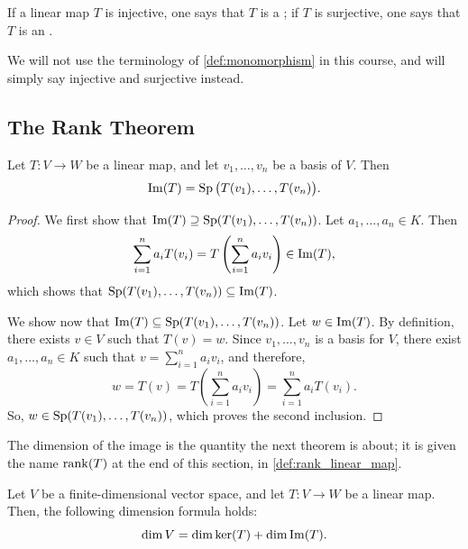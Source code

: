\begin{definition}
\label{def:monomorphism}
If a linear map $T$ is injective, one says that $T$ is a ; if $T$ is surjective, one says that $T$ is an .
\end{definition}

\begin{remark}
We will not use the terminology of \cref{def:monomorphism} in this course, and will simply say injective and surjective instead.
\end{remark}

\subsection{The Rank Theorem}

\begin{lemma}
\label{lem:image_spanned_by_basis}
Let $T: V \to W$ be a linear map, and let $v_1, \dots, v_n$ be a basis of $V$. Then
\[
\operatorname{Im}(T) = \operatorname{Sp}\big(T(v_1), \dots, T(v_n)\big).
\]
\end{lemma}

\begin{proof}
We first show that $\operatorname{Im}(T) \supseteq \operatorname{Sp}(T(v_1), \dots, T(v_n))$. Let $a_1, \dots, a_n \in K$. Then
\[
\sum_{i=1}^{n} a_i T(v_i) = T\left( \sum_{i=1}^{n} a_i v_i \right) \in \operatorname{Im}(T),
\]
which shows that $\operatorname{Sp}(T(v_1), \dots, T(v_n)) \subseteq \operatorname{Im}(T)$.

We show now that $\operatorname{Im}(T) \subseteq \operatorname{Sp}(T(v_1), \dots, T(v_n))$. Let $w \in \operatorname{Im}(T)$. By definition, there exists $v \in V$ such that $T(v) = w$. Since $v_1, \dots, v_n$ is a basis for $V$, there exist $a_1, \dots, a_n \in K$ such that $v = \sum_{i=1}^{n} a_i v_i$, and therefore,
\[
w = T(v) = T\left( \sum_{i=1}^{n} a_i v_i \right) = \sum_{i=1}^{n} a_i T(v_i).
\]
So, $w \in \operatorname{Sp}(T(v_1), \dots, T(v_n))$, which proves the second inclusion.
\end{proof}

The dimension of the image is the quantity the next theorem is about; it is given the name $\operatorname{rank}(T)$ at the end of this section, in \cref{def:rank_linear_map}.

\begin{theorem}
\label{thm:rank_nullity}
Let $V$ be a finite-di\-men\-sional vector space, and let $T: V \to W$ be a linear map. Then, the following dimension formula holds:
\[
\dim V = \dim \ker(T) + \dim \operatorname{Im}(T).
\]
\end{theorem}

